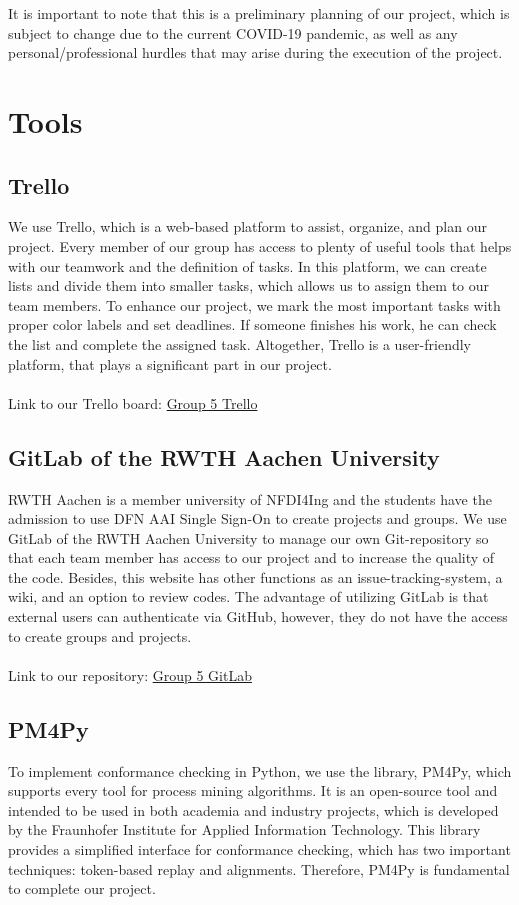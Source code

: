 \documentclass{article}
\begin{document}
It is important to note that this is a preliminary planning of our project, which is subject to change due to the current COVID-19 pandemic, as well as any personal/professional hurdles that may arise during the execution of the project. 

 \section{Tools}
 \subsection{Trello}
 We use Trello, which is a web-based platform to assist, organize, and plan our project. Every member of our group has access to plenty of useful tools that helps with our teamwork and the definition of tasks. In this platform, we can create lists and divide them into smaller tasks, which allows us to assign them to our team members. To enhance our project, we mark the most important tasks with proper color labels and set deadlines. If someone finishes his work, he can check the list and complete the assigned task. Altogether, Trello is a user-friendly platform, that plays a significant part in our project.\\ \\
 Link to our Trello board: \href{https://trello.com/b/UoTtYNXr/conformance-checking-group-5}{Group 5 Trello}
 \subsection{GitLab of the RWTH Aachen University}
 RWTH Aachen is a member university of NFDI4Ing and the students have the admission to use DFN AAI Single Sign-On to create projects and groups. We use GitLab of the RWTH Aachen University to manage our own Git-repository so that each team member has access to our project and to increase the quality of the code. Besides, this website has other functions as an issue-tracking-system, a wiki, and an option to review codes. The advantage of utilizing GitLab is that external users can authenticate via GitHub, however, they do not have the access to create groups and projects.\\ \\
 Link to our repository: \href{https://git.rwth-aachen.de/chan.yong.lee/conformance-checking}{Group 5 GitLab}

\subsection{PM4Py}
To implement conformance checking in Python, we use the library, PM4Py, which supports every tool for process mining algorithms. It is an open-source tool and intended to be used in both academia and industry projects, which is developed by the Fraunhofer Institute for Applied Information Technology. This library provides a simplified interface for conformance checking, which has two important techniques: token-based replay and alignments. Therefore, PM4Py is fundamental to complete our project.
\end{document}

